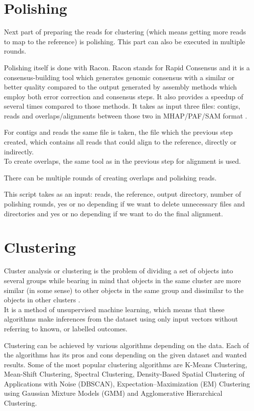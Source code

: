 \documentclass[times, utf8, zavrsni, numeric]{fer}
\begin{document}
\section{Polishing}
Next part of preparing the reads for clustering (which means getting more reads to map to 
the reference) is polishing. This part can also be executed in multiple rounds. 

Polishing itself is done with Racon. Racon stands for Rapid Consensus and it is a consensus-building 
tool which generates genomic consensus with a similar or better quality compared 
to the output generated by assembly methods which employ both error correction and consensus 
steps. It also provides a speedup of several times compared to those methods.
It takes as input three files: contigs, reads and overlaps/alignments between those two in MHAP/PAF/SAM format \cite{racon}.

For contigs and reads the same file is taken, the file which the previous step created, which contains
all reads that could align to the reference, directly or indirectly.  \\
To create overlaps, the same tool as in the previous step for alignment is used.

There can be multiple rounds of creating overlaps and polishing reads.

This script takes as an input: reads, the reference, output directory, number of polishing 
rounds, yes or no depending if we want to delete unnecessary files and directories and
yes or no depending if we want to do the final alignment. 

\section{Clustering}
Cluster analysis or clustering is the problem of dividing a set of objects into several
groups while bearing in mind that objects in the same cluster are more similar (in some sense) 
to other objects in the same group and dissimilar to the objects in other clusters \cite{clusterAnalysis}. \\
It is a method of unsupervised machine learning, which means that these algorithms make inferences
from the dataset using only input vectors without referring to known, or labelled outcomes.

Clustering can be achieved by various algorithms depending on the data. Each of the algorithms
has its pros and cons depending on the given dataset and wanted results. Some of the 
most popular clustering algorithms are K-Means Clustering, Mean-Shift Clustering, Spectral Clustering,
Density-Based Spatial Clustering of Applications with Noise (DBSCAN), Expectation–Maximization (EM) 
Clustering using Gaussian Mixture Models (GMM) and Agglomerative Hierarchical Clustering.
\end{document}
